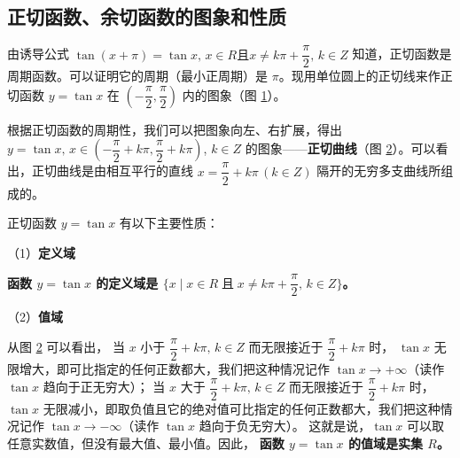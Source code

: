 \subsection{正切函数、余切函数的图象和性质}\label{subsec:2-10}

由诱导公式 $\tan(x + \pi) = \tan x, \, x \in R \text{且} x \neq k\pi + \dfrac \pi 2, \, k \in Z$
知道，正切函数是周期函数。可以证明它的周期（最小正周期）是 $\pi$。现用单位圆上的正切线来作正切函数
$y = \tan x$ 在 $\left( -\dfrac \pi 2, \dfrac \pi 2 \right)$ 内的图象（图 \ref{fig:2-27}）。

\begin{figure}[htbp]
    \centering
    
    \caption{}\label{fig:2-27}
\end{figure}

根据正切函数的周期性，我们可以把图象向左、右扩展，得出 \vspace{0.5em}
$y = \tan x, \, x \in \left( -\dfrac \pi 2 + k\pi, \dfrac \pi 2 + k\pi \right)$, $k \in Z$
的图象——\textbf{正切曲线}（图 \ref{fig:2-28}）。可以看出，正切曲线是由相互平行的直线
$x = \dfrac \pi 2 + k\pi \, (k \in Z)$ 隔开的无穷多支曲线所组成的。

\begin{figure}[htbp]
    \centering
    
    \caption{}\label{fig:2-28}
\end{figure}

正切函数 $y = \tan x$ 有以下主要性质：

（1）\textbf{定义域} 

\textbf{函数 $y = \tan x$ 的定义域是 $\{ x \mid x \in R \; \text{且} \; x \neq k\pi + \dfrac \pi 2, \, k \in Z \}$。}

（2）\textbf{值域} 

从图 \ref{fig:2-28} 可以看出，
当 $x$ 小于 $\dfrac \pi 2 + k\pi, \, k \in Z$ 而无限接近于 $\dfrac \pi 2 + k\pi$ 时，\vspace{0.5em}
$\tan x$ 无限增大，即可比指定的任何正数都大，我们把这种情况记作 $\tan x \to +\infty$（读作 $\tan x$ 趋向于正无穷大）；\vspace{0.5em}
当 $x$ 大于 $\dfrac \pi 2 + k\pi, \, k \in Z$ 而无限接近于 $\dfrac \pi 2 + k\pi$ 时，\vspace{0.5em}
$\tan x$ 无限减小，即取负值且它的绝对值可比指定的任何正数都大，我们把这种情况记作 $\tan x \to -\infty$（读作 $\tan x$ 趋向于负无穷大）。
这就是说，$\tan x$ 可以取任意实数值，但没有最大值、最小值。因此，
\textbf{函数 $y  = \tan x$ 的值域是实集 $R$。}

